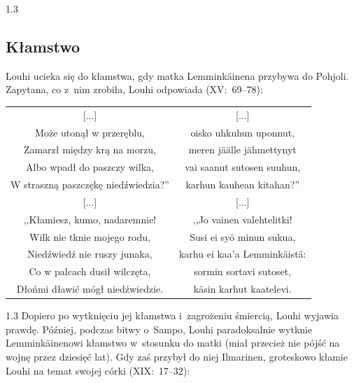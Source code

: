 \documentclass[11pt,a4paper,twoside]{report}
\begin{document}
\begin{spacing}{1.3}
\vspace*{0.5\baselineskip}
\subsection*{Kłamstwo}

Louhi ucieka się do kłamstwa, gdy matka Lemminkäinena przybywa do Pohjoli. Zapytana, co z~nim zrobiła, Louhi odpowiada (XV:~69--78):
\end{spacing}
{\centering
\small
\begin{longtable}{c c}
{[...]} & {[...]} \\
Może utonął w przeręblu, & oisko uhkuhun uponnut, \\
Zamarzł między krą na morzu, & meren jäälle jähmettynyt \\
Albo wpadł do paszczy wilka, & vai saanut sutosen suuhun, \\
W straszną paszczękę niedźwiedzia?'' & karhun kauhean kitahan?'' \\
{[...]} & {[...]} \\
,,Kłamiesz, kumo, nadaremnie! & ,,Jo vainen valehtelitki! \\
Wilk nie tknie mojego rodu, & Susi ei syö minun sukua, \\
Niedźwiedź nie ruszy junaka, & karhu ei kaa'a Lemminkäistä: \\
Co w palcach dusił wilczęta, & sormin sortavi sutoset, \\
Dłońmi dławić mógł niedźwiedzie. & käsin karhut kaatelevi. \\
\end{longtable}
}
\begin{spacing}{1.3}
Dopiero po wytknięciu jej kłamstwa i~zagrożeniu śmiercią, Louhi wyjawia prawdę. Później, podczas bitwy o~Sampo, Louhi paradoksalnie wytknie Lemminkäinenowi kłamstwo w~stosunku do matki (miał przecież nie pójść na wojnę przez dziesięć lat). Gdy zaś przybył do niej Ilmarinen, groteskowo kłamie Louhi na temat swojej córki (XIX:~17--32):
\end{spacing}
\end{document}
